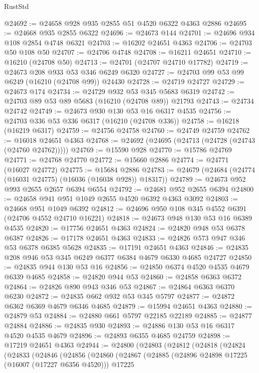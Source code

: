 \begin{lexlean}{RustStd}
\begin{coremodule}
@24692 := @24658 @928 @935 @2855 @51 @4520 @6322 @4363 @2886
@24695 := @24668 @935 @2855 @6322
@24696 := @24673 @144
@24701 := @24696 @934 @108 @2854 @4748 @6321
@24703 := @16202 @24651 @4363
@24706 := @24703 @50 @108 @50
@24707 := @24706 @4748
@24708 := @16211 @24651
@24710 := @16210 (@24708 @50)
@24713 := @24701 (@24707 @24710 @17782)
@24719 := @24673 @208 @933 @53 @346 @6249 @6320
@24727 := @24703 @99 @53 @99 @6249 (@16210 (@24708 @99)) @24430
@24728 := @24719 @24727
@24729 := @24673 @174
@24734 := @24729 @932 @53 @345 @5683 @6319
@24742 := @24703 @89 @53 @89 @5683 (@16210 (@24708 @89)) @21793
@24743 := @24734 @24742
@24749 := @24673 @930 @130 @53 @16 @6317 @4535
@24756 := @24703 @336 @53 @336 @6317 (@16210 (@24708 @336))
@24758 := @16218 (@16219 @6317)
@24759 := @24756 @24758
@24760 := @24749 @24759
@24762 := @16018 @24651 @4363
@24768 := @24692 (@24695 (@24713 (@24728 (@24743 (@24760 @24762)))))
@24769 := @15590 @928
@24770 := @15786 @24769
@24771 := @24768 @24770
@24772 := @15660 @2886
@24774 := @24771 (@16027 @24772)
@24775 := @15684 @2886
@24783 := @24679 (@24684 (@24774 (@16031 @24775) (@16036 (@16038 @928)) @18317))
@24789 := @24673 @952 @993 @2655 @2657 @6394 @6554
@24792 := @24681 @952 @2655 @6394
@24800 := @24658 @941 @951 @1049 @2655 @4520 @6392 @4363 @3092
@24803 := @24668 @951 @1049 @6392
@24812 := @24696 @950 @108 @345 @4552 @6391 (@24706 @4552 @24710 @16221)
@24818 := @24673 @948 @130 @53 @16 @6389 @4535
@24820 := @17756 @24651 @4363
@24824 := @24820 @948 @53 @6378 @6387
@24826 := @17178 @24651 @4363
@24833 := @24826 @573 @947 @346 @53 @6378 @6385 @5628
@24835 := @17191 @24651 @4363
@24846 := @24835 @208 @946 @53 @345 @6249 @6377 @6384 @4679 @6330 @4685 @24727
@24850 := @24835 @944 @130 @53 @16
@24856 := @24850 @6374 @4520 @4535 @4679 @6339 @4685
@24858 := @24820 @944 @53
@24860 := @24858 @6363 @6372
@24864 := @24826 @890 @943 @346 @53
@24867 := @24864 @6363 @6370 @6230
@24872 := @24835 @662 @932 @53 @345 @5797
@24877 := @24872 @6362 @6369 @4679 @6346 @4685
@24879 := @15994 @24651 @4363
@24880 := @24879 @53
@24884 := @24880 @661 @5797 @22185 @22189
@24885 := @24877 @24884
@24886 := @24835 @930
@24893 := @24886 @130 @53 @16 @6317 @4520 @4535 @4679
@24896 := @24893 @6355 @4685 @24759
@24898 := @17219 @24651 @4363
@24944 := @24800
    (@24803
      (@24812
        (@24818
          (@24824
            (@24833
              (@24846
                (@24856
                  (@24860
                    (@24867
                      (@24885
                        (@24896 @24898 @17225 (@16007 (@17227 @6356 @4520)))
                        @17225

\end{coremodule}
\end{lexlean}
